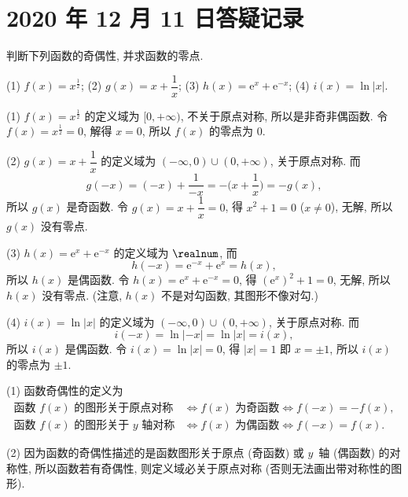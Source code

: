 \section{2020 年 12 月 11 日答疑记录}


\begin{example}
    判断下列函数的奇偶性, 并求函数的零点.
    
    (1) $f(x)= x^{\frac12}$;\qquad
    (2) $g(x)= x+\dfrac1x$;\qquad
    (3) $h(x)= \mathrm{e}^x+\mathrm{e}^{-x}$;\qquad
    (4) $i(x)= \ln|x|$.
\end{example}
\begin{solution}
    (1) $f(x)= x^{\frac12}$ 的定义域为 $[0,+\infty)$, 不关于原点对称, 所以是非奇非偶函数. 令 $f(x)=x^{\frac12}=0$, 解得 $x=0$, 所以 $f(x)$ 的零点为 $0$.
    
    (2) $g(x)= x+\dfrac1x$ 的定义域为 $(-\infty,0)\cup(0,+\infty)$, 关于原点对称. 而 
    \[g(-x)= (-x)+\dfrac1{-x}= -\biggl(x+\dfrac1x\biggr)= -g(x),\]
    所以 $g(x)$ 是奇函数. 令 $g(x)= x+\dfrac1x= 0$, 得 $x^2+1=0$ ($x\neq 0$), 无解, 所以 $g(x)$ 没有零点.
    
    (3) $h(x)= \mathrm{e}^x+\mathrm{e}^{-x}$ 的定义域为 $\realnum$, 而
    \[h(-x)= \mathrm{e}^{-x}+\mathrm{e}^x= h(x),\]
    所以 $h(x)$ 是偶函数. 令 $h(x)= \mathrm{e}^x+\mathrm{e}^{-x}= 0$, 得 $(\mathrm{e}^x)^2+1=0$, 无解, 所以 $h(x)$ 没有零点. (注意, $h(x)$ 不是对勾函数, 其图形不像对勾.)
    
    (4) $i(x)= \ln|x|$ 的定义域为 $(-\infty,0)\cup(0,+\infty)$, 关于原点对称. 而 
    \[i(-x)= \ln|-x|= \ln|x|= i(x),\]
    所以 $i(x)$ 是偶函数. 令 $i(x)= \ln|x|= 0$, 得 $|x|=1$ 即 $x=\pm1$, 所以 $i(x)$ 的零点为 $\pm1$.
\end{solution}
\begin{remark}
    (1) 函数奇偶性的定义为
    \[\begin{aligned}
        \text{函数 $f(x)$ 的图形关于原点对称}
        &\Leftrightarrow\text{$f(x)$ 为奇函数}
        \Leftrightarrow f(-x)=-f(x),\\
        \text{函数 $f(x)$ 的图形关于 $y$~轴对称}
        &\Leftrightarrow\text{$f(x)$ 为偶函数}
        \Leftrightarrow f(-x)=f(x).
    \end{aligned}\]
    
    (2) 因为函数的奇偶性描述的是函数图形关于原点 (奇函数) 或 $y$~轴 (偶函数) 的对称性, 所以函数若有奇偶性, 则定义域必关于原点对称 (否则无法画出带对称性的图形).
\end{remark}

